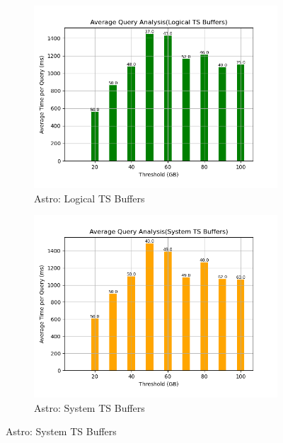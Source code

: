 \begin{figure}
	\centering
	\begin{subfigure}[c]{0.45\textwidth}
		\includegraphics[width=1\textwidth]   {figures/Experiments/Dynamic/ASTRO/Batch_processing/50/average_query_time_per_batch_version_999777015_10485760_10_delay[50].png}
		\caption{Astro: Logical TS Buffers}
		\label{fig:logical-ts-50-astro}
	\end{subfigure}
	\begin{subfigure}[c]{0.45\textwidth}
		\includegraphics[width=1\textwidth]	 {figures/Experiments/Dynamic/ASTRO/Batch_processing/50/average_query_time_per_batch_version_999777018_10485760_10_delay[50].png}
		\caption{Astro: System TS Buffers}
		\label{fig:system-ts-50-astro}

\end{subfigure}
\end{figure}
